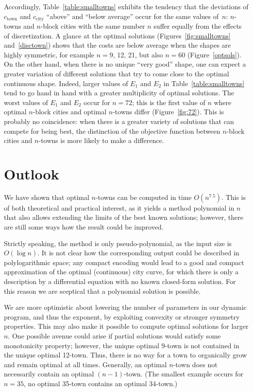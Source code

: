 \documentclass[preprint,authoryear,12pt]{elsarticle}
\begin{document}
Accordingly, Table~\ref{table:smalltowns} exhibits the tendency
that the deviations of $c_{\textrm{town}}$ and $c_{\textrm{city}}$
``above'' and ``below average'' occur for the same values of~$n$:
$n$-towns and $n$-block cities with the same number $n$ suffer
equally from the effects of discretization.
A glance at the optimal solutions (Figures~\ref{fig:smalltowns}
and~\ref{disctown})
shows that
the costs are
below average when the shapes are highly symmetric, for example
$n=9$, 12, 21, but also $n=60$  (Figure~\ref{optsols}).
On the other hand, when there is no unique ``very good'' shape, one
can expect a greater variation of different solutions that try to come
close to the optimal continuous shape.  Indeed, larger values of $E_1$
and $E_2$ in Table~\ref{table:smalltowns} tend to go hand in hand with
a greater multiplicity of optimal solutions. The worst values of $E_1$
and $E_2$ occur for $n=72$; this is the first value of $n$ where optimal
$n$-block cities and optimal $n$-towns differ (Figure~\ref{fig:72}).
This is probably no coincidence:
when there is a greater variety of solutions that can compete for being
best, the distinction of the objective function between $n$-block
cities and $n$-towns is more likely to make a difference.

\section{Outlook}
\label{sec:outlook}

We have shown that optimal $n$-towns can be computed
in time $O(n^{7.5})$. This is of both theoretical and practical
interest, as it yields a method polynomial in $n$ that also allows extending
the limits of the best known solutions; however,
there are still some ways how the result could be improved.

Strictly speaking, the method is only pseudo-polynomial, as
the input size is $O(\log n)$. It is not clear how
the corresponding output could be described in polylogarithmic
space; any compact encoding would
lead to
 a good and compact
approximation of the optimal (continuous) city curve, for which there is
only a description by a differential equation with no known closed-form solution.
For this reason we are sceptical that a polynomial solution
is possible.



We are more optimistic about lowering the number of parameters
in our dynamic program, and thus the exponent, by exploiting
convexity or
stronger symmetry properties. This may also make it possible to compute
optimal solutions for larger $n$.
One possible avenue could arise if partial solutions
would satisfy some monotonicity property; however,
the unique optimal 9-town is not contained in the unique optimal 12-town.
Thus, there is no way for a town to organically grow
and remain optimal at all times.
Generally,
an optimal $n$-town does not necessarily contain an optimal
 $(n-1)$-town.
(The smallest example occurs for $n=35$,
no optimal 35-town contains an optimal 34-town.)
\end{document}
